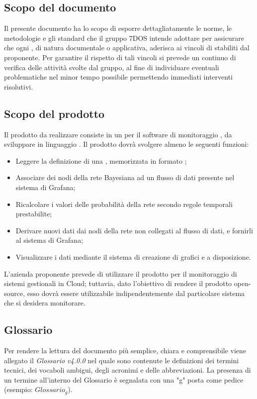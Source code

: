 \subsection{Scopo del documento}
Il presente documento ha lo scopo di esporre dettagliatamente le norme, le metodologie e gli standard che il gruppo 7DOS intende adottare per assicurare che ogni , di natura documentale o applicativa, aderisca ai vincoli di  stabiliti dal proponente. Per garantire il rispetto di tali vincoli si prevede un continuo  di verifica delle attività svolte dal gruppo, al fine di individuare eventuali problematiche nel minor tempo possibile permettendo immediati interventi risolutivi.
\subsection{Scopo del prodotto}
Il prodotto da realizzare consiste in un  per il software di monitoraggio , da sviluppare in linguaggio . Il prodotto dovrà svolgere almeno le seguenti funzioni:
\begin{itemize}
	\item{Leggere la definizione di una , memorizzata in formato ;}
	\item{Associare dei nodi della rete Bayesiana ad un flusso di dati presente nel sistema di Grafana;}
	\item{Ricalcolare i valori delle probabilità della rete secondo regole temporali prestabilite;}
	\item{Derivare nuovi dati dai nodi della rete non collegati al flusso di dati, e fornirli al sistema di Grafana;}
	\item{Visualizzare i dati mediante il sistema di creazione di grafici e  a disposizione.}
\end{itemize}
L'azienda proponente prevede di utilizzare il prodotto per il monitoraggio di sistemi gestionali in Cloud; tuttavia, dato l'obiettivo di rendere il prodotto open-source, esso dovrà essere utilizzabile indipendentemente dal particolare sistema che si desidera monitorare.
\subsection{Glossario}
Per rendere la lettura del documento più semplice, chiara e comprensibile viene allegato il \emph{Glossario v4.0.0} nel quale sono contenute le definizioni dei termini tecnici, dei vocaboli ambigui, degli acronimi e delle abbreviazioni. La presenza di un termine all'interno del Glossario è segnalata con una "g" posta come pedice (esempio: $Glossario_{g}$).
